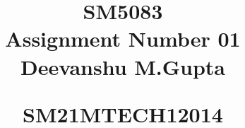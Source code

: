 \documentclass[journal,12pt,twocolumn]{IEEEtran}
\begin{document}
%


\newtheorem{theorem}{Theorem}[section]
\newtheorem{problem}{Problem}
\newtheorem{proposition}{Proposition}[section]
\newtheorem{lemma}{Lemma}[section]
\newtheorem{corollary}[theorem]{Corollary}
\newtheorem{example}{Example}[section]
\newtheorem{definition}[problem]{Definition}
\newcommand{\BEQA}{\begin{eqnarray}}
\newcommand{\EEQA}{\end{eqnarray}}
\newcommand{\define}{\stackrel{\triangle}{=}}




\providecommand{\mbf}{\mathbf}
\providecommand{\pr}[1]{\ensuremath{\Pr\left(#1\right)}}
\providecommand{\qfunc}[1]{\ensuremath{Q\left(#1\right)}}
\providecommand{\sbrak}[1]{\ensuremath{{}\left[#1\right]}}
\providecommand{\lsbrak}[1]{\ensuremath{{}\left[#1\right.}}
\providecommand{\rsbrak}[1]{\ensuremath{{}\left.#1\right]}}
\providecommand{\brak}[1]{\ensuremath{\left(#1\right)}}
\providecommand{\lbrak}[1]{\ensuremath{\left(#1\right.}}
\providecommand{\rbrak}[1]{\ensuremath{\left.#1\right)}}
\providecommand{\cbrak}[1]{\ensuremath{\left\{#1\right\}}}
\providecommand{\lcbrak}[1]{\ensuremath{\left\{#1\right.}}
\providecommand{\rcbrak}[1]{\ensuremath{\left.#1\right\}}}
\theoremstyle{remark}
\newtheorem{rem}{Remark}
\newcommand{\sgn}{\mathop{\mathrm{sgn}}}
\providecommand{\abs}[1]{\lvert#1\rvert}
\providecommand{\res}[1]{\Res\displaylimits_{#1}} 
\providecommand{\norm}[1]{\lVert#1\rVert}
\providecommand{\mtx}[1]{\mathbf{#1}}
\providecommand{\fourier}{\overset{\mathcal{F}}{ \rightleftharpoons}}
\providecommand{\system}{\overset{\mathcal{H}}{ \longleftrightarrow}}
\newcommand{\solution}{\noindent \textbf{Solution: }}
\newcommand{\cosec}{\,\text{cosec}\,}
\providecommand{\dec}[2]{\ensuremath{\overset{#1}{\underset{#2}{\gtrless}}}}
\newcommand{\myvec}[1]{\ensuremath{\begin{pmatrix}#1\end{pmatrix}}}
\newcommand{\cmyvec}[1]{\ensuremath{\begin{pmatrix*}[c]#1\end{pmatrix*}}}
\newcommand{\mydet}[1]{\ensuremath{\begin{vmatrix}#1\end{vmatrix}}}
\newcommand{\proj}[2]{\textbf{proj}_{\vec{#1}}\vec{#2}}
\newcommand{\RNum}[1]{\uppercase\expandafter{\romannumeral #1\relax}}
\let\StandardTheFigure\thefigure
\let\vec\mathbf


\title{
\LARGE SM5083\\
    \LARGE Assignment Number 01 \\[0.5em]
    
    \large Deevanshu M.Gupta\par
    \large   SM21MTECH12014  \par
}
\maketitle
\end{document}
